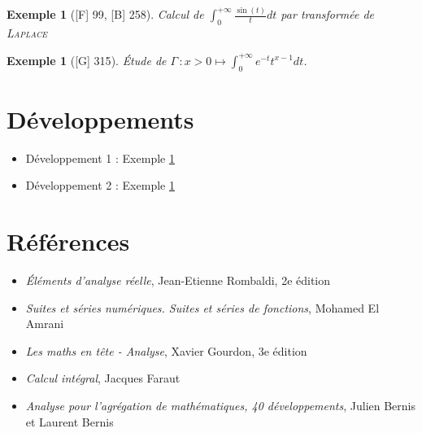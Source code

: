 \documentclass[10pt, a4paper, parskip=full, twoside, twocolumn]{report}
\newtheorem{example}[definition]{Exemple}
\begin{document}
\begin{tcolorbox}[
    breakable, %
    colback=developpement, %
    colframe=gray!0!black, %
    boxrule=0pt, %
    arc=1mm, %
	boxsep=0pt,
	left=0pt, right=0pt, top=0pt, bottom=0pt
]
\begin{example}[\textnormal{[F] 99, [B] 258}]
	\label{228dev1}
	Calcul de $\int_{0}^{+\infty} \frac{\sin(t)}{t}dt$ par transformée de \textsc{Laplace}
\end{example}
\end{tcolorbox}

\begin{tcolorbox}[
    breakable, %
    colback=developpement, %
    colframe=gray!0!black, %
    boxrule=0pt, %
    arc=1mm, %
	boxsep=0pt,
	left=0pt, right=0pt, top=0pt, bottom=0pt
]
\begin{example}[\textnormal{[G] 315}]
	\label{228dev2}
	Étude de $\Gamma\,\colon x > 0 \mapsto \int_{0}^{+\infty} e^{-t}t^{x-1}dt$.
\end{example}
\end{tcolorbox}

\section*{Développements}
\begin{itemize}
	\item Développement 1 : Exemple \ref{228dev1}
	\item Développement 2 : Exemple \ref{228dev2}
\end{itemize}

\section*{Références}
\begin{itemize}	
	\item[R] \emph{Éléments d'analyse réelle}, Jean-Etienne Rombaldi, 2e édition
	\item[EA] \emph{Suites et séries numériques. Suites et séries de fonctions}, Mohamed El Amrani
	\item[G] \emph{Les maths en tête - Analyse}, Xavier Gourdon, 3e édition 
	\item[F] \emph{Calcul intégral}, Jacques Faraut
	\item[Be] \emph{Analyse pour l'agrégation de mathématiques, 40 développements}, Julien Bernis et Laurent Bernis
\end{itemize}
\end{document}

